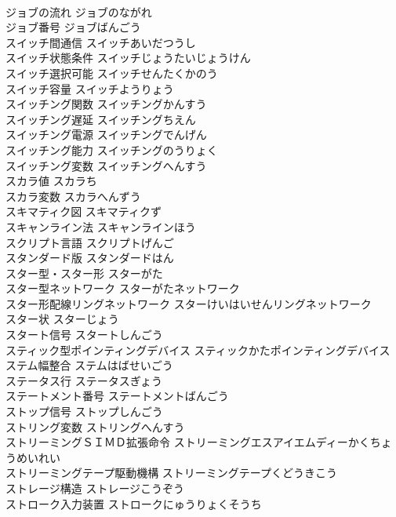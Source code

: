 \documentclass[8pt]{extreport}
\begin{document}
\begin{CJK}{UTF8}{min}
\\	ジョブの流れ	ジョブのながれ	
\\	ジョブ番号	ジョブばんごう	
\\	スイッチ間通信	スイッチあいだつうし	
\\	スイッチ状態条件	スイッチじょうたいじょうけん	
\\	スイッチ選択可能	スイッチせんたくかのう	
\\	スイッチ容量	スイッチようりょう	
\\	スイッチング関数	スイッチングかんすう	
\\	スイッチング遅延	スイッチングちえん	
\\	スイッチング電源	スイッチングでんげん	
\\	スイッチング能力	スイッチングのうりょく	
\\	スイッチング変数	スイッチングへんすう	
\\	スカラ値	スカラち	
\\	スカラ変数	スカラへんずう	
\\	スキマティク図	スキマティクず	
\\	スキャンライン法	スキャンラインほう	
\\	スクリプト言語	スクリプトげんご	
\\	スタンダード版	スタンダードはん	
\\	スター型・スター形	スターがた	
\\	スター型ネットワーク	スターがたネットワーク	
\\	スター形配線リングネットワーク	スターけいはいせんリングネットワーク	
\\	スター状	スターじょう	
\\	スタート信号	スタートしんごう	
\\	スティック型ポインティングデバイス	スティックかたポインティングデバイス	
\\	ステム幅整合	ステムはばせいごう	
\\	ステータス行	ステータスぎょう	
\\	ステートメント番号	ステートメントばんごう	
\\	ストップ信号	ストップしんごう	
\\	ストリング変数	ストリングへんすう	
\\	ストリーミングＳＩＭＤ拡張命令	ストリーミングエスアイエムディーかくちょうめいれい	
\\	ストリーミングテープ駆動機構	ストリーミングテープくどうきこう	
\\	ストレージ構造	ストレージこうぞう	
\\	ストローク入力装置	ストロークにゅうりょくそうち	

\end{CJK}
\end{document}
